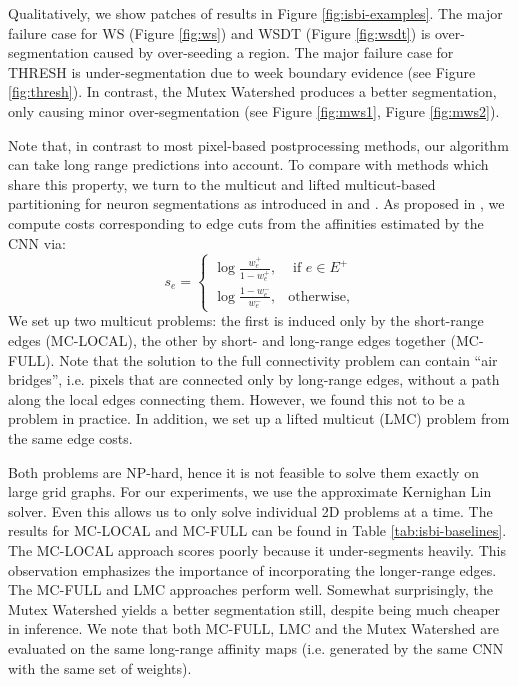 Qualitatively, we show patches of results in Figure \ref{fig:isbi-examples}.
The major failure case for WS (Figure \ref{fig:ws}) and WSDT (Figure \ref{fig:wsdt})
is over-segmentation caused by over-seeding a region.
The major failure case for THRESH is under-segmentation due to week boundary evidence (see Figure \ref{fig:thresh}).
In contrast, the Mutex Watershed produces a better segmentation, only causing minor over-segmentation (see Figure \ref{fig:mws1}, Figure \ref{fig:mws2}).

Note that, in contrast to most pixel-based postprocessing methods, our algorithm can take long
range predictions into account. To compare with methods which share this property, we turn to the multicut and lifted multicut-based partitioning for neuron segmentations as
introduced in \cite{andres_12_globally} and \cite{horvnakova2017analysis}. As proposed in \cite{andres2012globally}, we compute costs corresponding to edge cuts from the affinities estimated by the CNN via:
\begin{equation}
\label{mc_costs}
    s_e = \begin{cases}
        \log \frac{w^+_e}{1 - w^+_e} , &\text{ if } e \in E^+ \\
        \log \frac{1 - w^-_e}{w^-_e}, & \text{otherwise},
    \end{cases}
\end{equation}
We set up two multicut problems: the first is induced only by the short-range edges (MC-LOCAL), the other by short- and long-range edges together (MC-FULL). Note that the solution to the full connectivity problem can contain ``air bridges'', i.e. 
pixels that are connected only by long-range edges, without a path along the local edges connecting them.
However, we found this not to be a problem in practice.
In addition, we set up a lifted multicut (LMC) problem from the same edge costs.

Both problems are NP-hard, hence it is not feasible to solve them exactly on
large grid graphs. For our experiments, we use the approximate Kernighan Lin \cite{kernighan1970efficient,keuper2015efficient} solver.
Even this allows us to only solve individual 2D problems at a time.
The results for MC-LOCAL and MC-FULL can be found in Table \ref{tab:isbi-baselines}.
The MC-LOCAL approach scores poorly because it under-segments heavily.
This observation emphasizes the importance of incorporating the longer-range edges.
The MC-FULL and LMC approaches perform well. Somewhat surprisingly, the Mutex Watershed yields a better segmentation still,
despite being much cheaper in inference. We note that both MC-FULL, LMC and the Mutex Watershed are evaluated on the same long-range affinity maps (i.e. generated by the same CNN with the same set of weights). 





